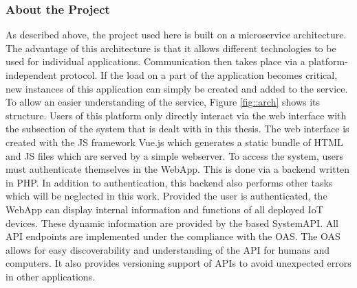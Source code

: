 \documentclass[12pt, a4paper]{article}
\begin{document}
        \subsubsection{About the Project}
        As described above, the project used here is built on a microservice architecture. The advantage of this architecture is that it allows different technologies to be used for individual applications. Communication then takes place via a platform-independent protocol. If the load on a part of the application becomes critical, new instances of this application can simply be created and added to the service.\newline
        To allow an easier understanding of the service, Figure \ref{fig::arch} shows its structure. Users of this platform only directly interact via the web interface with the subsection of the system that is dealt with in this thesis.
        The web interface is created with the \ac{JS} framework Vue.js which generates a static bundle of HTML and \ac{JS} files which are served by a simple webserver. To access the system, users must authenticate themselves in the WebApp. This is done via a backend written in PHP. In addition to authentication, this backend also performs other tasks which will be neglected in this work. Provided the user is authenticated, the WebApp can display internal information and functions of all deployed \ac{IoT} devices. These dynamic information are provided by the  based SystemAPI. All \ac{API} endpoints are implemented under the compliance with the \ac{OAS}. The \ac{OAS} allows for easy discoverability and understanding of the \ac{API} for humans and computers. It also provides versioning support of \ac{API}s to avoid unexpected errors in other applications. \newline
\end{document}
